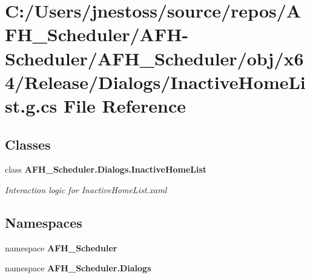 \section{C\+:/\+Users/jnestoss/source/repos/\+A\+F\+H\+\_\+\+Scheduler/\+A\+F\+H-\/\+Scheduler/\+A\+F\+H\+\_\+\+Scheduler/obj/x64/\+Release/\+Dialogs/\+Inactive\+Home\+List.g.\+cs File Reference}
\label{x64_2_release_2_dialogs_2_inactive_home_list_8g_8cs}
\subsection*{Classes}
\begin{DoxyCompactItemize}
\item 
class \textbf{ A\+F\+H\+\_\+\+Scheduler.\+Dialogs.\+Inactive\+Home\+List}
\begin{DoxyCompactList}\small\item\em Interaction logic for Inactive\+Home\+List.\+xaml \end{DoxyCompactList}\end{DoxyCompactItemize}
\subsection*{Namespaces}
\begin{DoxyCompactItemize}
\item 
namespace \textbf{ A\+F\+H\+\_\+\+Scheduler}
\item 
namespace \textbf{ A\+F\+H\+\_\+\+Scheduler.\+Dialogs}
\end{DoxyCompactItemize}
